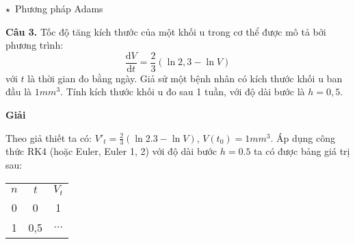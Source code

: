 $\star$~Phương pháp Adams


\textbf{Câu 3.} Tốc độ tăng kích thước của một khối u trong cơ thể được mô tả bởi phương trình: $$\frac{\text{d}V}{\text{d}t}=\frac{2}{3}\left(\ln{2,3} - \ln{V} \right)$$ với $t$ là thời gian đo bằng ngày. Giả sử một bệnh nhân có kích thước khối u ban đầu là $1mm^3$. Tính kích thước khối u đo sau 1 tuần, với độ dài bước là $h=0,5.$\par
\textbf{Giải}\par
Theo giả thiết ta có: ${V'}_t= \frac{2}{3}\left(\ln{2.3}-\ln{V} \right)$, $V(t_0)=1mm^3 $. Áp dụng công thức RK4 (hoặc Euler, Euler 1, 2) với độ dài bước $h=0.5$ ta có được bảng giá trị sau:
\begin{longtable}{|c|c|c|}
	$n$ & $t$ & $V_t$    \\
	0   & 0   & 1        \\
	1   & 0,5 & $\ldots$ \\
\end{longtable}

 